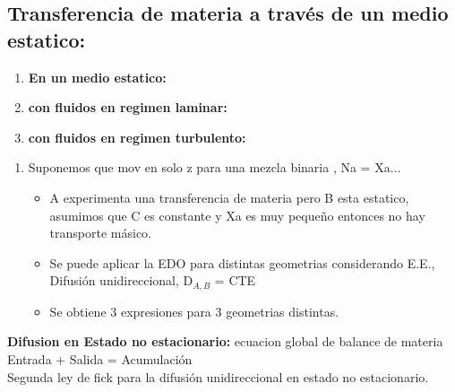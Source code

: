 \documentclass{report}
\begin{document}
\begin{raggedright}
\begin{raggedright}
\subsection{Transferencia de materia a través de un medio estatico:}
\begin{enumerate}[label=\textbf{\alph*)}]
	\item \textbf{En un medio estatico:}
	\item \textbf{con fluidos en regimen laminar:}
	\item \textbf{con fluidos en regimen turbulento:}
\end{enumerate}
\vspace{2\baselineskip}
\begin{enumerate}[label=\textbf{\alph*)}]
	\item Suponemos que mov en solo z para una mezcla binaria , Na = Xa$\dots$\\
	\begin{itemize}
		\item A experimenta una transferencia de materia pero B esta estatico, asumimos que C es constante y Xa es muy pequeño entonces no hay transporte másico.\\
		\item Se puede aplicar la EDO para distintas geometrias considerando E.E.,  Difusión unidireccional, D$_{A,B}$ = CTE 
		\item [] Se obtiene 3 expresiones para 3 geometrias distintas.

	\end{itemize}
	
	
\end{enumerate}
{\textbf{Difusion en Estado no estacionario:}}
ecuacion global de balance de materia Entrada + Salida = Acumulación \\
\vspace{1\baselineskip}
Segunda ley de fick para la difusión unidireccional en estado no estacionario.\\

\end{raggedright}


\end{raggedright}
\end{document}
